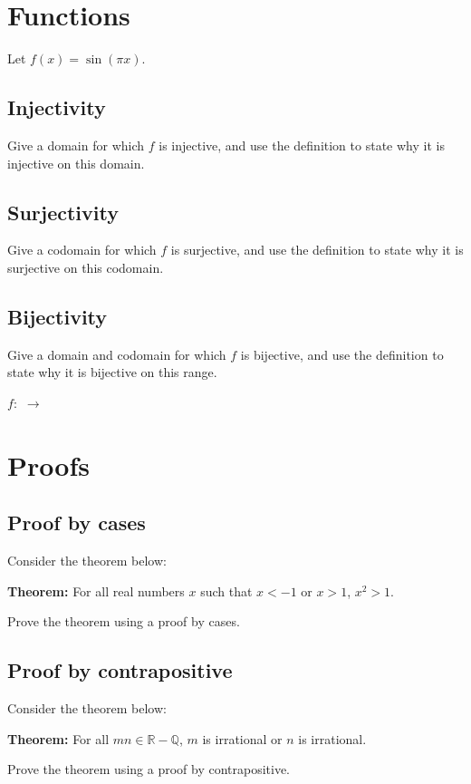\documentclass{article}
\begin{document}
\newpage
\section{Functions}
Let $f(x) = \sin(\pi x)$.
\subsection{Injectivity}
Give a domain for which $f$ is injective, and use the definition to state why it is injective on this domain.

\vspace{3cm}

\subsection{Surjectivity}
Give a codomain for which $f$ is surjective, and use the definition to state why it is surjective on this codomain.

\vspace{3cm}

\subsection{Bijectivity}
Give a domain and codomain for which $f$ is bijective, and use the definition to state why it is bijective on this range.
\begin{center}
    $f:$ \hspace{1.5cm} $\to$         
\end{center}

\newpage

\section{Proofs}
\subsection{Proof by cases}
Consider the theorem below:
\begin{center}
    \textbf{Theorem:} For all real numbers $x$ such that $x < -1$ or $x>1$, $x^2 > 1$.
\end{center}
Prove the theorem using a proof by cases.

\vspace{6cm}

\subsection{Proof by contrapositive}
Consider the theorem below:
\begin{center}
    \textbf{Theorem:} For all $mn\in \mathbb{R} - \mathbb{Q}$, $m$ is irrational or $n$ is irrational.
\end{center}
Prove the theorem using a proof by contrapositive.
\end{document}
